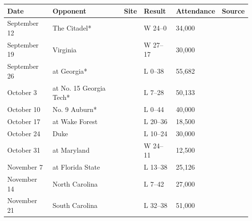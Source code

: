 \documentclass{article}
\begin{document}
\begin{tabular}{llllll}
\toprule
Date & Opponent & Site & Result & Attendance & Source \\
\midrule
September 12 & The Citadel* &  & W 24–0 & 34,000 &  \\
September 19 & Virginia &  & W 27–17 & 30,000 &  \\
September 26 & at Georgia* &  & L 0–38 & 55,682 &  \\
October 3 & at No. 15 Georgia Tech* &  & L 7–28 & 50,133 &  \\
October 10 & No. 9 Auburn* &  & L 0–44 & 40,000 &  \\
October 17 & at Wake Forest &  & L 20–36 & 18,500 &  \\
October 24 & Duke &  & L 10–24 & 30,000 &  \\
October 31 & at Maryland &  & W 24–11 & 12,500 &  \\
November 7 & at Florida State &  & L 13–38 & 25,126 &  \\
November 14 & North Carolina &  & L 7–42 & 27,000 &  \\
November 21 & South Carolina &  & L 32–38 & 51,000 &  \\
\bottomrule
\end{tabular}
\end{document}
